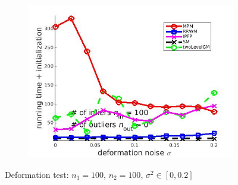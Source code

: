 \documentclass[
	fontsize=12pt,
	paper=a4,
	twoside=false,
	numbers=noenddot,
	plainheadsepline,
	toc=listof,
	toc=bibliography
]{scrartcl}
\begin{document}
\begin{figure}[h]
\begin{subfigure}[b]{0.3\textwidth}
		\includegraphics[scale=0.25]{"fig_ver2608/syntheticPointSets/ver4.2.1/deformation/time_summary_avg10t"} 
	\end{subfigure} 	
	\caption{Deformation test: $n_1=100$, $n_2=100$, $\sigma^2\in[0, 0.2]$}
	\label{fig:test1_ver421}
\end{figure}

\FloatBarrier	
\end{document}
